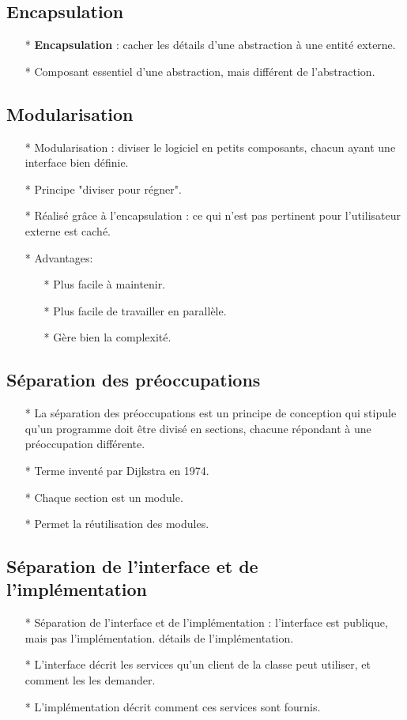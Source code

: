 \documentclass[12pt]{article}
\begin{document}
\subsection{Encapsulation}
\begin{itemize}
	\item[* ] \textbf{Encapsulation} : cacher les détails d'une abstraction à une entité externe.
	\item[* ] Composant essentiel d'une abstraction, mais différent de l'abstraction.
\end{itemize}
\subsection{Modularisation}
\begin{itemize}
	\item[* ] Modularisation : diviser le logiciel en petits composants, chacun ayant une
	interface bien définie.
	\item[* ] Principe "diviser pour régner".
	\item[* ] Réalisé grâce à l'encapsulation : ce qui n'est pas pertinent pour l'utilisateur externe est
	caché.
	\item[* ] Advantages:
	\begin{itemize}
		\item[* ] Plus facile à maintenir.
		\item[* ] Plus facile de travailler en parallèle.
		\item[* ] Gère bien la complexité.
	\end{itemize}
\end{itemize}
\subsection{Séparation des préoccupations}
\begin{itemize}
	\item[* ] La séparation des préoccupations est un principe de conception qui stipule qu'un programme doit être divisé en sections, chacune répondant à une préoccupation différente.
	\item[* ] Terme inventé par Dijkstra en 1974.
	\item[* ] Chaque section est un module.
	\item[* ] Permet la réutilisation des modules.
\end{itemize}
\subsection{Séparation de l'interface et de l'implémentation}
\begin{itemize}
	\item[* ] Séparation de l'interface et de l'implémentation : l'interface est publique, mais pas l'implémentation.
	détails de l'implémentation.
	\item[* ] L'interface décrit les services qu'un client de la classe peut utiliser, et comment les
	les demander.
	\item[* ] L'implémentation décrit comment ces services sont fournis.
\end{itemize}
\end{document}
